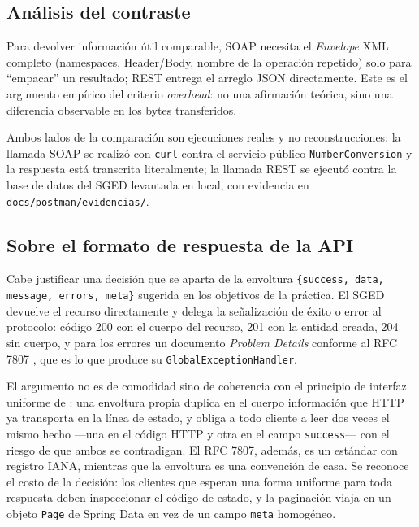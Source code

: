 \documentclass[12pt,a4paper]{article}
\begin{document}
\subsection{Análisis del contraste}

Para devolver información útil comparable, SOAP necesita el \textit{Envelope} XML completo
(namespaces, Header/Body, nombre de la operación repetido) solo para ``empacar'' un resultado;
REST entrega el arreglo JSON directamente.
Este es el argumento empírico del criterio \textit{overhead}: no una afirmación teórica,
sino una diferencia observable en los bytes transferidos.

Ambos lados de la comparación son ejecuciones reales y no reconstrucciones: la llamada SOAP se
realizó con \texttt{curl} contra el servicio público \texttt{NumberConversion} y la respuesta
está transcrita literalmente; la llamada REST se ejecutó contra la base de datos del SGED
levantada en local, con evidencia en \texttt{docs/postman/evidencias/}.

\subsection{Sobre el formato de respuesta de la API}
\label{sec:envoltorio}

Cabe justificar una decisión que se aparta de la envoltura
\texttt{\{success, data, message, errors, meta\}} sugerida en los objetivos de la práctica. El
SGED devuelve el recurso directamente y delega la señalización de éxito o error al protocolo:
código 200 con el cuerpo del recurso, 201 con la entidad creada, 204 sin cuerpo, y para los
errores un documento \textit{Problem Details} conforme al RFC 7807 \parencite{rfc7807}, que es lo
que produce su \texttt{GlobalExceptionHandler}.

El argumento no es de comodidad sino de coherencia con el principio de interfaz uniforme de
\textcite{fielding2000}: una envoltura propia duplica en el cuerpo información que HTTP ya
transporta en la línea de estado, y obliga a todo cliente a leer dos veces el mismo hecho ---una
en el código HTTP y otra en el campo \texttt{success}--- con el riesgo de que ambos se
contradigan. El RFC 7807, además, es un estándar con registro IANA, mientras que la envoltura es
una convención de casa. Se reconoce el costo de la decisión: los clientes que esperan una forma
uniforme para toda respuesta deben inspeccionar el código de estado, y la paginación viaja en un
objeto \texttt{Page} de Spring Data en vez de un campo \texttt{meta} homogéneo.
\end{document}
